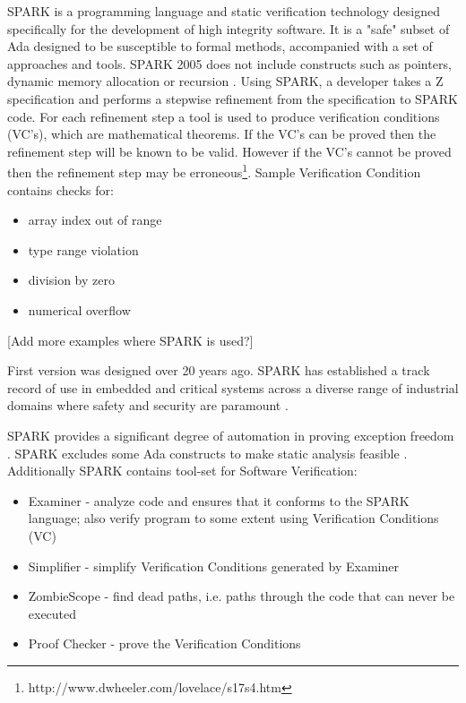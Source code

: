 SPARK is a programming language and static verification technology designed specifically for the development of high integrity software. It is a "safe" subset of Ada designed to be susceptible to formal methods, accompanied with a set of approaches and tools. SPARK 2005 does not include constructs such as pointers, dynamic memory allocation or recursion \cite{Spark:Article}. Using SPARK, a developer takes a Z specification and performs a stepwise refinement from the specification to SPARK code. For each refinement step a tool is used to produce verification conditions (VC's), which are mathematical theorems. If the VC's can be proved then the refinement step will be known to be valid. However if the VC's cannot be proved then the refinement step may be erroneous\footnote{http://www.dwheeler.com/lovelace/s17s4.htm}. Sample Verification Condition contains checks for:
\begin{itemize}
    \item array index out of range
    \item type range violation
    \item division by zero
    \item numerical overflow
\end{itemize}

[Add more examples where SPARK is used?]

First version was designed over 20 years ago. SPARK has established a track record of use in embedded and critical systems across a diverse range of industrial domains where safety and security are paramount \cite{Barnes:Book}. 

SPARK provides a significant degree of automation in proving exception freedom \cite{Spark:Article}. SPARK excludes some Ada constructs to make static analysis feasible \cite{Spark:Article}. Additionally SPARK contains tool-set for Software Verification:
\begin{itemize} \itemsep1pt \parskip0pt 
	\item Examiner - analyze code and ensures that it conforms to the SPARK language; also verify program to some extent using Verification Conditions (VC)
	\item Simplifier - simplify Verification Conditions generated by Examiner
	\item ZombieScope - find dead paths, i.e. paths through the code that can never be executed
	\item Proof Checker - prove the Verification Conditions
\end{itemize}

